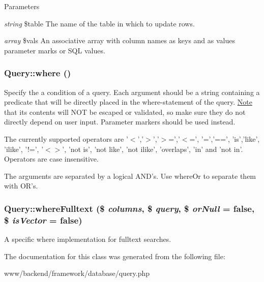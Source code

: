 \begin{DoxyParams}{Parameters}
\item[{\em string}]\$table The name of the table in which to update rows. \item[{\em array}]\$vals An associative array with column names as keys and as values parameter marks or SQL values. \end{DoxyParams}
\hypertarget{classQuery_ab1781adb9932c6280373e2abd698f9c8}{
\subsubsection[{where}]{\setlength{\rightskip}{0pt plus 5cm}Query::where ()}}
\label{classQuery_ab1781adb9932c6280373e2abd698f9c8}
Specify the a condition of a query. Each argument should be a string containing a predicate that will be directly placed in the where-\/statement of the query. \hyperlink{classNote}{Note} that its contents will NOT be escaped or validated, so make sure they do not directly depend on user input. Parameter markers should be used instead.

The currently supported operators are '$<$','$>$','$>$=','$<$=', '=','==', 'is','like', 'ilike', '!=', '$<$$>$', 'not is', 'not like', 'not ilike', 'overlaps', 'in' and 'not in'. Operators are case insensitive.

The arguments are separated by a logical AND's. Use whereOr to separate them with OR's. \hypertarget{classQuery_a44bf1140a6525d7f7e82f7d47e93b87c}{
\subsubsection[{whereFulltext}]{\setlength{\rightskip}{0pt plus 5cm}Query::whereFulltext (\$ {\em columns}, \/  \$ {\em query}, \/  \$ {\em orNull} = {\ttfamily false}, \/  \$ {\em isVector} = {\ttfamily false})}}
\label{classQuery_a44bf1140a6525d7f7e82f7d47e93b87c}
A specific where implementation for fulltext searches. 

The documentation for this class was generated from the following file:\begin{DoxyCompactItemize}
\item 
www/backend/framework/database/query.php\end{DoxyCompactItemize}
